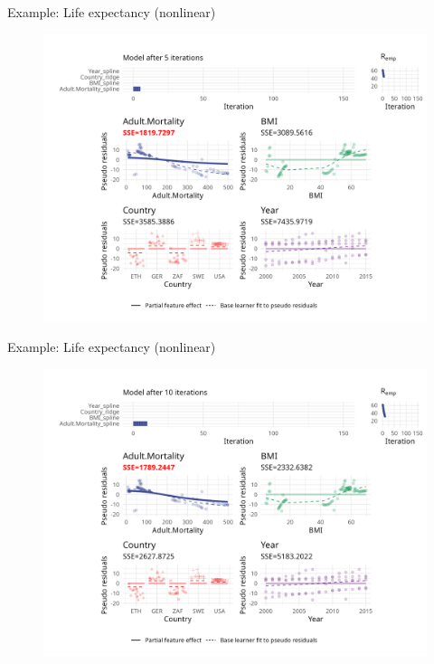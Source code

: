 \begin{frame}{Example: Life expectancy (nonlinear)}
	\begin{figure}
		\centering
		\includegraphics[width=\textwidth]{figure/cwb-anim-nl/fig-iter-0005.png}
	\end{figure}
	\addtocounter{framenumber}{-1}
\end{frame}


\begin{frame}{Example: Life expectancy (nonlinear)}
	\begin{figure}
		\centering
		\includegraphics[width=\textwidth]{figure/cwb-anim-nl/fig-iter-0010.png}
	\end{figure}
	\addtocounter{framenumber}{-1}
\end{frame}



